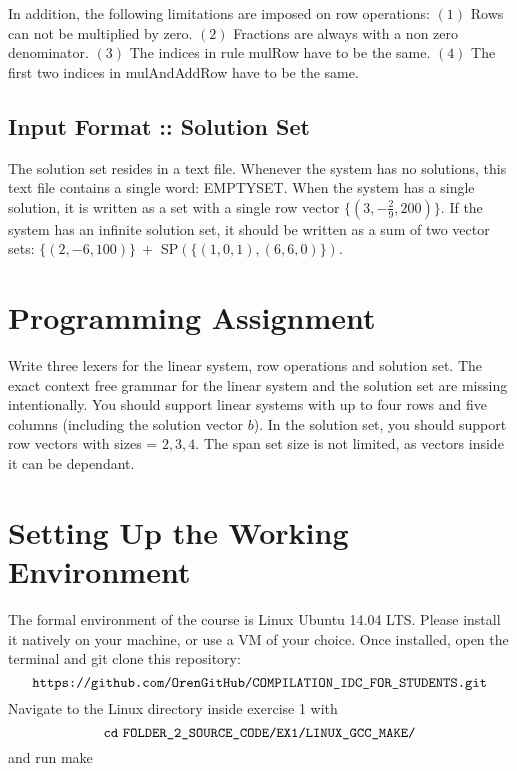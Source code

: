 \documentclass{article}
\begin{document}
In addition, the following limitations are imposed on row operations:
$(1)$ Rows can not be multiplied by zero.
$(2)$ Fractions are always with a non zero denominator.
$(3)$ The indices in rule mulRow have to be the same.
$(4)$ The first two indices in mulAndAddRow have to be the same.

\subsection*{Input Format :: Solution Set}
The solution set resides in a text file.
Whenever the system has no solutions, this text file contains a single word:
EMPTYSET. When the system has a single solution, it is written as a set 
with a single row vector $\{(3,-\frac{2}{9},200)\}$. If the system has an infinite
solution set, it should be written as a sum of two vector sets:
$\{(2,-6,100)\} ~ +$ SP$(\{(1,0,1), (6,6,0)\})$.

\section{Programming Assignment}
Write three lexers for the linear system, row operations and solution set.
The exact context free grammar for the linear system and the solution set are missing intentionally.
You should support linear systems with up to four rows and five columns
(including the solution vector $b$).
In the solution set, you should support row vectors with sizes = $2,3,4$.
The span set size is not limited, as vectors inside it can be dependant.

\section{Setting Up the Working Environment}
The formal environment of the course is Linux Ubuntu 14.04 LTS.
Please install it natively on your machine, or use a VM of your choice.
Once installed, open the terminal and git clone this repository:
\[
\verb"https://github.com/OrenGitHub/COMPILATION_IDC_FOR_STUDENTS.git"
\]
Navigate to the Linux directory inside exercise 1 with
\[
\verb"cd" ~
\verb"FOLDER_2_SOURCE_CODE/EX1/LINUX_GCC_MAKE/"
\]
and run make
\end{document}

